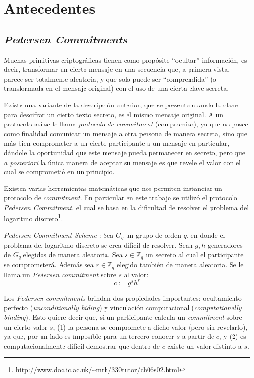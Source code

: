 \chapter{Antecedentes}\label{cap2}
\section{\emph{Pedersen Commitments}}

Muchas primitivas criptográficas tienen como propósito ``ocultar'' información, es decir, transformar un cierto mensaje en una 
secuencia que, a primera vista, parece ser totalmente aleatoria, y que solo puede ser ``comprendida'' (o transformada en el 
mensaje original) con el uso de una cierta clave secreta.

Existe una variante de la descripción anterior, que se presenta cuando la clave para descifrar un cierto texto secreto, es el 
mismo mensaje original. A un protocolo así se le llama \emph{protocolo de commitment} (compromiso), ya que no posee como finalidad 
comunicar un mensaje a otra persona de manera secreta, sino que más bien comprometer a un cierto participante a un mensaje en particular, 
dándole la oportunidad que este mensaje pueda permanecer en secreto, pero que \emph{a posteriori} la única manera de aceptar su 
mensaje es que revele el valor con el cual se comprometió en un principio.

Existen varias herramientas matemáticas que nos permiten instanciar un protocolo de \emph{commitment}. En particular en este 
trabajo se utilizó el protocolo \emph{Pedersen Commitment}\cite{pedersen1991non}, el cual se basa en la dificultad de resolver el 
problema del logaritmo discreto\footnote{\url{http://www.doc.ic.ac.uk/~mrh/330tutor/ch06s02.html}}.

\emph{Pedersen Commitment Scheme} \cite{pedersen1991non}: Sea $G_q$ un grupo de orden $q$, en donde el problema del logaritmo discreto se crea difícil 
de resolver. Sean $g,h$ generadores de $G_q$ elegidos de manera aleatoria. Sea $s \in \mathbb{Z}_q$ un secreto al cual el 
participante se comprometerá. Además sea $r \in \mathbb{Z}_q$ elegido también de manera aleatoria. Se le llama un \emph{Pedersen commitment} 
sobre $s$ al valor: $$c := g^s h^r$$

Los \emph{Pedersen commitments} brindan dos propiedades importantes: 
  ocultamiento perfecto (\emph{unconditionally hiding}) y 
  vinculación computacional (\emph{computationally binding}). 
Esto quiere decir que, si un participante calcula un \emph{commitment} sobre un 
  cierto valor $s$, 
  (1) la persona se compromete a dicho valor (pero sin revelarlo), ya que, 
  por un lado es imposible para un tercero conocer $s$ a partir de $c$, 
  y (2) es computacionalmente difícil demostrar que dentro de $c$ existe un valor distinto a $s$.

